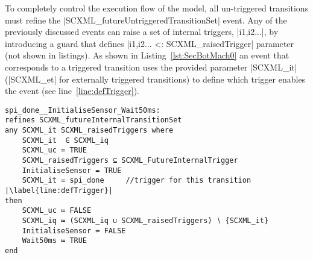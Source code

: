 To completely control the execution flow of the model, all un-triggered transitions must refine the |SCXML_futureUntriggeredTransitionSet| event. 
Any of the previously discussed events can raise a set of internal triggers, |{i1,i2...}|, by introducing a guard that defines |{i1,i2...} <: SCXML_raisedTrigger| parameter (not shown in listings). 
As shown in Listing~\ref{lst:SecBotMach0} an event that corresponds to a triggered transition uses the provided parameter |SCXML_it| (|SCXML_et| for externally triggered transitions) to define which trigger enables the event (see line~\ref{line:defTrigger}).

\begin{lstlisting}[caption={Event-B event corresponding to internal triggered transition to \textbf{Wait50ms} state in refinement level 1 shown in Fig.~\ref{fig:ASIC}}, label={lst:SecBotMach0},language=Event-B, escapechar=|, frame=single, float=t]
spi_done__InitialiseSensor_Wait50ms:	
refines SCXML_futureInternalTransitionSet 
any SCXML_it SCXML_raisedTriggers where
	SCXML_it  ∈ SCXML_iq 
	SCXML_uc = TRUE
	SCXML_raisedTriggers ⊆ SCXML_FutureInternalTrigger
	InitialiseSensor = TRUE
	SCXML_it = spi_done  	//trigger for this transition |\label{line:defTrigger}|
then
	SCXML_uc ≔ FALSE
	SCXML_iq ≔ (SCXML_iq ∪ SCXML_raisedTriggers) ∖ {SCXML_it}
	InitialiseSensor ≔ FALSE
	Wait50ms ≔ TRUE
end
\end{lstlisting}

